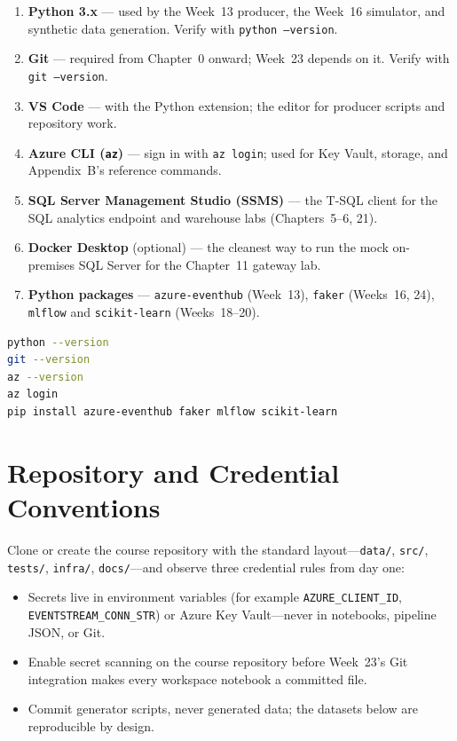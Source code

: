 \begin{enumerate}
    \item \textbf{Python 3.x} --- used by the Week~13 producer, the Week~16 simulator, and synthetic
    data generation. Verify with \texttt{python --version}.
    \item \textbf{Git} --- required from Chapter~0 onward; Week~23 depends on it. Verify with
    \texttt{git --version}.
    \item \textbf{VS Code} --- with the Python extension; the editor for producer scripts and
    repository work.
    \item \textbf{Azure CLI (\texttt{az})} --- sign in with \texttt{az login}; used for Key Vault,
    storage, and Appendix~B's reference commands.
    \item \textbf{SQL Server Management Studio (SSMS)} --- the T-SQL client for the SQL analytics
    endpoint and warehouse labs (Chapters~5--6, 21).
    \item \textbf{Docker Desktop} (optional) --- the cleanest way to run the mock on-premises
    SQL Server for the Chapter~11 gateway lab.
    \item \textbf{Python packages} --- \texttt{azure-eventhub} (Week~13), \texttt{faker} (Weeks~16,
    24), \texttt{mlflow} and \texttt{scikit-learn} (Weeks~18--20).
\end{enumerate}

\begin{lstlisting}[language=bash,caption={One-time tool verification (PowerShell).},label={lst:appendixa-verify}]
python --version
git --version
az --version
az login
pip install azure-eventhub faker mlflow scikit-learn
\end{lstlisting}

\section{Repository and Credential Conventions}
%
Clone or create the course repository with the standard layout---\texttt{data/}, \texttt{src/},
\texttt{tests/}, \texttt{infra/}, \texttt{docs/}---and observe three credential rules from day one:

\begin{itemize}
    \item Secrets live in environment variables (for example \texttt{AZURE\_CLIENT\_ID},
    \texttt{EVENTSTREAM\_CONN\_STR}) or Azure Key Vault---never in notebooks, pipeline JSON, or Git.
    \item Enable secret scanning on the course repository before Week~23's Git integration makes every
    workspace notebook a committed file.
    \item Commit generator scripts, never generated data; the datasets below are reproducible by design.
\end{itemize}

